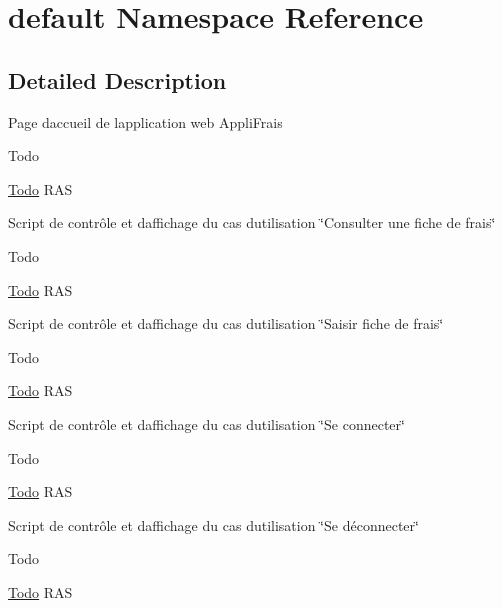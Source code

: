\hypertarget{namespacedefault}{}\section{default Namespace Reference}
\label{namespacedefault}


\subsection{Detailed Description}
Page d\textquotesingle{}accueil de l\textquotesingle{}application web Appli\+Frais

\begin{DoxyRefDesc}{Todo}
\item[\hyperlink{todo__todo000001}{Todo}]R\+A\+S \end{DoxyRefDesc}


Script de contrôle et d\textquotesingle{}affichage du cas d\textquotesingle{}utilisation \char`\"{}\+Consulter une fiche de frais\char`\"{}

\begin{DoxyRefDesc}{Todo}
\item[\hyperlink{todo__todo000002}{Todo}]R\+A\+S \end{DoxyRefDesc}


Script de contrôle et d\textquotesingle{}affichage du cas d\textquotesingle{}utilisation \char`\"{}\+Saisir fiche de frais\char`\"{}

\begin{DoxyRefDesc}{Todo}
\item[\hyperlink{todo__todo000003}{Todo}]R\+A\+S \end{DoxyRefDesc}


Script de contrôle et d\textquotesingle{}affichage du cas d\textquotesingle{}utilisation \char`\"{}\+Se connecter\char`\"{}

\begin{DoxyRefDesc}{Todo}
\item[\hyperlink{todo__todo000004}{Todo}]R\+A\+S \end{DoxyRefDesc}


Script de contrôle et d\textquotesingle{}affichage du cas d\textquotesingle{}utilisation \char`\"{}\+Se déconnecter\char`\"{}

\begin{DoxyRefDesc}{Todo}
\item[\hyperlink{todo__todo000005}{Todo}]R\+A\+S \end{DoxyRefDesc}


